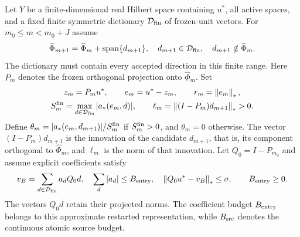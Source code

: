 \documentclass[11pt]{article}
\theoremstyle{remark}
\begin{document}
Let $Y$ be a finite-dimensional real Hilbert space containing $u^*$,
all active spaces, and a fixed finite symmetric dictionary
$\mathcal D_{\rm fin}$ of frozen-unit vectors. For $m_0\leq m<m_0+J$ assume
\begin{equation}
 \widehat\Phi_{m+1}=\widehat\Phi_m+\operatorname{span}\{d_{m+1}\},
 \quad d_{m+1}\in\mathcal D_{\rm fin},\quad d_{m+1}\notin\widehat\Phi_m .
 \label{eq:c5-spaces}
\end{equation}
The dictionary must contain every accepted direction in this finite range.
Here $P_m$ denotes the frozen orthogonal projection onto $\widehat\Phi_m$.
Set
\[
 \begin{gathered}
 z_m=P_mu^*,\qquad e_m=u^*-z_m,\qquad r_m=\left\lVert e_m\right\rVert_*,\\
 S_m^{\rm fin}=\max_{d\in\mathcal D_{\rm fin}}|a_*(e_m,d)|,\qquad
 \ell_m=\left\lVert(I-P_m)d_{m+1}\right\rVert_*>0 .
 \end{gathered}
\]
Define $\theta_m=|a_*(e_m,d_{m+1})|/S_m^{\rm fin}$ if
$S_m^{\rm fin}>0$, and $\theta_m=0$ otherwise.
The vector $(I-P_m)d_{m+1}$ is the innovation of the candidate
$d_{m+1}$, that is, its component orthogonal to $\widehat\Phi_m$, and
$\ell_m$ is the norm of that innovation.
Let $Q_0=I-P_{m_0}$ and assume explicit coefficients satisfy
\begin{equation}
 v_B=\sum_{d\in\mathcal D_{\rm fin}}a_dQ_0d,\quad
 \sum_d|a_d|\leq B_{\rm entry},\quad
 \left\lVert Q_0u^*-v_B\right\rVert_*\leq\sigma,\qquad B_{\rm entry}\geq0.
 \label{eq:c5-entry-source}
\end{equation}
The vectors \(Q_0d\) retain their projected norms. The coefficient budget \(B_{\rm entry}\) belongs to this approximate restarted representation, while \(B_{\rm src}\) denotes the continuous atomic source budget.
\end{document}
